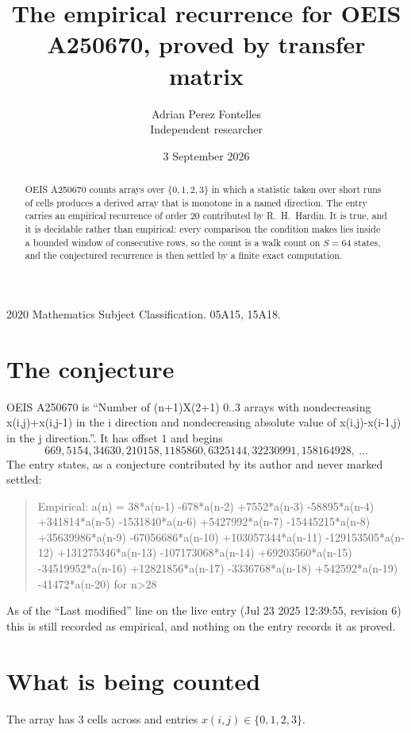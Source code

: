 \documentclass[11pt,a4paper]{article}
\title{The empirical recurrence for OEIS A250670, proved by transfer matrix}
\author{Adrian Perez Fontelles\\ \small Independent researcher}
\date{3 September 2026}
\theoremstyle{plain}
\theoremstyle{definition}
\begin{document}
\maketitle

\begin{abstract}
OEIS A250670 counts arrays over $\{0,1,2,3\}$ in which a statistic taken over short runs
of cells produces a derived array that is monotone in a named direction. The entry carries an
empirical recurrence of order $20$ contributed by R.~H.~Hardin. It is true, and it is
decidable rather than empirical: every comparison the condition makes lies inside a bounded
window of consecutive rows, so the count is a walk count on $S=64$ states, and the
conjectured recurrence is then settled by a finite exact computation.
\end{abstract}

\noindent\small 2020 Mathematics Subject Classification. 05A15, 15A18.\normalsize

\section{The conjecture}

OEIS A250670 is ``Number of (n+1)X(2+1) 0..3 arrays with nondecreasing x(i,j)+x(i,j-1) in the i direction and nondecreasing absolute value of x(i,j)-x(i-1,j) in the j direction.''. It has offset $1$ and begins
\[
669, 5154, 34630, 210158, 1185860, 6325144, 32230991, 158164928,\ \dots
\]
The entry states, as a conjecture contributed by its author and never marked settled:
\begin{quote}
Empirical: a(n) = 38*a(n-1) -678*a(n-2) +7552*a(n-3) -58895*a(n-4) +341814*a(n-5) -1531840*a(n-6) +5427992*a(n-7) -15445215*a(n-8) +35639986*a(n-9) -67056686*a(n-10) +103057344*a(n-11) -129153505*a(n-12) +131275346*a(n-13) -107173068*a(n-14) +69203560*a(n-15) -34519952*a(n-16) +12821856*a(n-17) -3336768*a(n-18) +542592*a(n-19) -41472*a(n-20) for n>28
\end{quote}
As of the ``Last modified'' line on the live entry (Jul 23 2025 12:39:55, revision 6) this is still
recorded as empirical, and nothing on the entry records it as proved.

\section{What is being counted}

The array has $3$ cells across and entries $x(i,j)\in\{0,1,2,3\}$.
\end{document}
